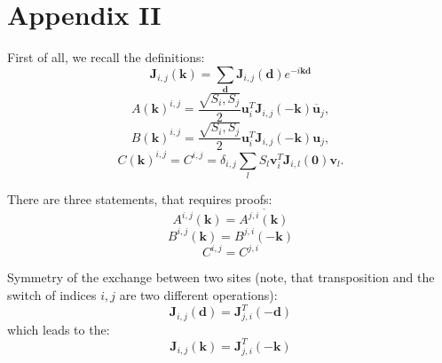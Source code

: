 \section{Appendix II}

First of all, we recall the definitions:
\begin{equation}
    \boldsymbol{J}_{i,j}(\boldsymbol{k}) = \sum_{\boldsymbol{d}}\boldsymbol{J}_{i,j}(\boldsymbol{d})e^{-i\boldsymbol{k}\boldsymbol{d}}
\end{equation}
\begin{equation}
    A(\boldsymbol{k})^{i,j} = \dfrac{\sqrt{S_i, S_j}}{2}\boldsymbol{u}^T_i\boldsymbol{J}_{i,j}(-\boldsymbol{k})\overline{\boldsymbol{u}}_j,
\end{equation}
\begin{equation}
    B(\boldsymbol{k})^{i,j} = \dfrac{\sqrt{S_i, S_j}}{2}\boldsymbol{u}^T_i\boldsymbol{J}_{i,j}(-\boldsymbol{k})\boldsymbol{u}_j,
\end{equation}
\begin{equation}
    C(\boldsymbol{k})^{i,j} = C^{i,j} = \delta_{i,j}\sum_{l}S_l \boldsymbol{v}^T_i\boldsymbol{J}_{i, l}(\boldsymbol{0})\boldsymbol{v}_l.
\end{equation}

There are three statements, that requires proofs:
\begin{equation}
    A^{i,j}(\boldsymbol{k}) = \overline{A^{j,i}(\boldsymbol{k})}
\end{equation}
\begin{equation}
    B^{i,j}(\boldsymbol{k}) = B^{j,i}(-\boldsymbol{k})
\end{equation}
\begin{equation}
    C^{i,j} = C^{j,i}
\end{equation}

Symmetry of the exchange between two sites (note, that transposition and the switch of indices $i,j$ are two different operations):
\begin{equation}
    \boldsymbol{J}_{i,j}(\boldsymbol{d}) = \boldsymbol{J}_{j,i}^T(-\boldsymbol{d})
\end{equation}
which leads to the:
\begin{equation}
    \boldsymbol{J}_{i,j}(\boldsymbol{k}) = \boldsymbol{J}_{j,i}^T(-\boldsymbol{k})
\end{equation}

